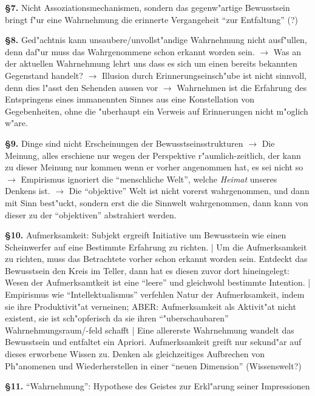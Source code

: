 \documentclass[emulatestandardclasses]{scrartcl}
\begin{document}
\textbf{\S 7.} Nicht Assoziationsmechanismen, sondern das gegenw"artige Bewusstsein bringt f"ur eine Wahrnehmung die erinnerte Vergangeheit "`zur Entfaltung"' (?)\newline

\textbf{\S 8.} Ged"achtnis kann unsaubere/unvollst"andige Wahrnehmung nicht ausf"ullen, denn daf"ur muss das Wahrgenommene schon erkannt worden sein. $\rightarrow$ Was an der aktuellen Wahrnehmung lehrt uns dass es sich um einen bereits bekannten Gegenstand handelt? $\rightarrow$ Illusion durch Erinnerungseinsch"ube ist nicht sinnvoll, denn dies l"asst den Sehenden aussen vor $\rightarrow$ Wahrnehmen ist die Erfahrung des Entspringens eines immanennten Sinnes aus eine Konstellation von Gegebenheiten, ohne die "uberhaupt ein Verweis auf Erinnerungen nicht m"oglich w"are.\newline

\textbf{\S 9.} Dinge sind nicht Erscheinungen der Bewusstseinsstrukturen $\rightarrow$ Die Meinung, alles erschiene nur wegen der Perspektive r"aumlich-zeitlich, der kann zu dieser Meinung nur kommen wenn er vorher angenommen hat, es sei nicht so $\rightarrow$ Empirismus ignoriert die "`menschliche Welt"', welche \emph{Heimat} unseres Denkens ist. $\rightarrow$ Die "`objektive"' Welt ist nicht vorerst wahrgenommen, und dann mit Sinn best"uckt, sondern erst die die Sinnwelt wahrgenommen, dann kann von dieser zu der "`objektiven"' abstrahiert werden.\newline

\textbf{\S 10.} Aufmerksamkeit: Subjekt ergreift Initiative um Bewusstsein wie einen Scheinwerfer auf eine Bestimmte Erfahrung zu richten. | Um die Aufmerksamkeit zu richten, muss das Betrachtete vorher schon erkannt worden sein. Entdeckt das Bewusstsein den Kreis im Teller, dann hat es diesen zuvor dort hineingelegt: Wesen der Aufmerksamtkeit ist eine "`leere"' und gleichwohl bestimmte Intention. | Empirismus wie "`Intellektualismus"' verfehlen Natur der Aufmerksamkeit, indem sie ihre Produktivit"at verneinen; ABER: Aufmerksamkeit als Aktivit"at nicht existent, sie ist sch"opferisch da sie ihren "`"uberschaubaren"' Wahrnehmungsraum/-feld schafft | Eine allererste Wahrnehmung wandelt das Bewusstsein und entfaltet ein Apriori. Aufmerksamkeit greift nur sekund"ar auf dieses erworbene Wissen zu. Denken als gleichzeitiges Aufbrechen von Ph"anomenen und Wiederherstellen in einer "`neuen Dimension"' (Wissenswelt?)\newline

\textbf{\S 11.} "`Wahrnehmung"': Hypothese des Geistes zur Erkl"arung seiner Impressionen
\end{document}
